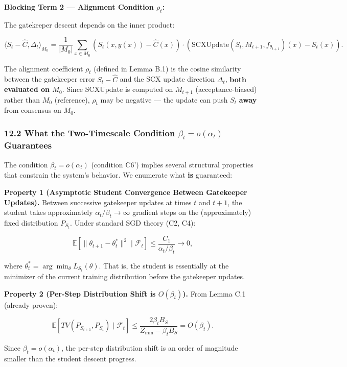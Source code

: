 \documentclass[
  12pt,
]{ctexart}
\begin{document}
\textbf{Blocking Term 2 --- Alignment Condition \(\rho_t\):}

The gatekeeper descent depends on the inner product:

\[\langle S_t - \hat{C}, \Delta_t \rangle_{M_0} = \frac{1}{|M_0|} \sum_{x \in M_0} (S_t(x, y(x)) - \hat{C}(x)) \cdot (\text{SCXUpdate}(S_t, M_{t+1}, f_{\theta_{t+1}})(x) - S_t(x)).\]

The alignment coefficient \(\rho_t\) (defined in Lemma B.1) is the
cosine similarity between the gatekeeper error \(S_t - \hat{C}\) and the
SCX update direction \(\Delta_t\), \textbf{both evaluated on \(M_0\)}.
Since SCXUpdate is computed on \(M_{t+1}\) (acceptance-biased) rather
than \(M_0\) (reference), \(\rho_t\) may be negative --- the update can
push \(S_t\) \textbf{away} from consensus on \(M_0\).

\subsubsection{\texorpdfstring{12.2 What the Two-Timescale Condition
\(\beta_t = o(\alpha_t)\)
Guarantees}{12.2 What the Two-Timescale Condition \textbackslash beta\_t = o(\textbackslash alpha\_t) Guarantees}}\label{what-the-two-timescale-condition-beta_t-oalpha_t-guarantees}

The condition \(\beta_t = o(\alpha_t)\) (condition C6') implies several
structural properties that constrain the system's behavior. We enumerate
what \textbf{is} guaranteed:

\textbf{Property 1 (Asymptotic Student Convergence Between Gatekeeper
Updates).} Between successive gatekeeper updates at times \(t\) and
\(t+1\), the student takes approximately
\(\alpha_t / \beta_t \to \infty\) gradient steps on the (approximately)
fixed distribution \(P_{S_t}\). Under standard SGD theory (C2, C4):

\[\mathbb{E}[\|\theta_{t+1} - \theta_t^*\|^2 \mid \mathcal{F}_t] \leq \frac{C_1}{\alpha_t / \beta_t} \to 0,\]

where \(\theta_t^* = \arg\min_\theta L_{S_t}(\theta)\). That is, the
student is essentially at the minimizer of the current training
distribution before the gatekeeper updates.

\textbf{Property 2 (Per-Step Distribution Shift is \(O(\beta_t)\)).}
From Lemma C.1 (already proven):

\[\mathbb{E}[TV(P_{S_{t+1}}, P_{S_t}) \mid \mathcal{F}_t] \leq \frac{2\beta_t B_S}{Z_{\min} - \beta_t B_S} = O(\beta_t).\]

Since \(\beta_t = o(\alpha_t)\), the per-step distribution shift is an
order of magnitude smaller than the student descent progress.
\end{document}
